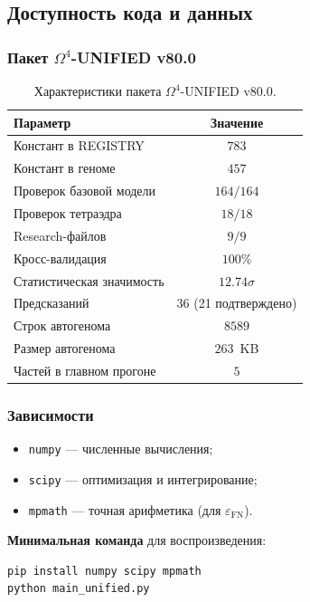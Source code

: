 \documentclass[11pt,a4paper]{article}
\newcommand{\Om}{\ensuremath{\Omega^4}}
\theoremstyle{definition}
\begin{document}
\subsection{Доступность кода и данных}
\label{subsec:conclusions-availability}

\subsubsection{Пакет \texorpdfstring{$\Om$}{}-UNIFIED v80.0}

\begin{table}[ht]
\centering
\caption{Характеристики пакета \texorpdfstring{$\Om$}{}-UNIFIED v80.0.}
\label{tab:conclusions-package}
\begin{tabular}{lc}
\toprule
Параметр & Значение \\
\midrule
Констант в REGISTRY & $783$ \\
Констант в геноме & $457$ \\
Проверок базовой модели & $164/164$ \\
Проверок тетраэдра & $18/18$ \\
Research-файлов & $9/9$ \\
Кросс-валидация & $100\%$ \\
Статистическая значимость & $12.74\sigma$ \\
Предсказаний & $36$ (21 подтверждено) \\
Строк автогенома & $8589$ \\
Размер автогенома & $263$~KB \\
Частей в главном прогоне & $5$ \\
\bottomrule
\end{tabular}
\end{table}

\subsubsection{Зависимости}

\begin{itemize}
    \item \texttt{numpy} --- численные вычисления;
    \item \texttt{scipy} --- оптимизация и интегрирование;
    \item \texttt{mpmath} --- точная арифметика (для $\varepsilon_{\text{FN}}$).
\end{itemize}

\medskip\noindent
\textbf{Минимальная команда} для воспроизведения:
\begin{verbatim}
pip install numpy scipy mpmath
python main_unified.py
\end{verbatim}
\end{document}
